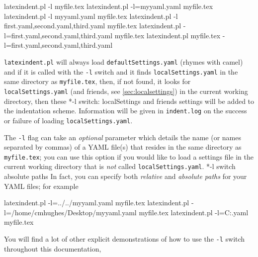 	\begin{commandshell}
latexindent.pl -l myfile.tex
latexindent.pl -l=myyaml.yaml myfile.tex
latexindent.pl -l myyaml.yaml myfile.tex
latexindent.pl -l first.yaml,second.yaml,third.yaml myfile.tex
latexindent.pl -l=first.yaml,second.yaml,third.yaml myfile.tex
latexindent.pl myfile.tex -l=first.yaml,second.yaml,third.yaml 
\end{commandshell}

	\label{page:localswitch}
	\texttt{latexindent.pl} will always load \texttt{defaultSettings.yaml} (rhymes with camel)
	and if it is called with the \texttt{-l} switch and it finds
	\texttt{localSettings.yaml} in the same directory as \texttt{myfile.tex}, then, if not
    found, it looks for \texttt{localSettings.yaml} (and friends, see \vref{sec:localsettings}) 
    in the current working directory, then these
	*{-l switch: localSettings and friends}
	settings will be added to the indentation scheme. Information will be given in
	\texttt{indent.log} on the success or failure of loading \texttt{localSettings.yaml}.

	The \texttt{-l} flag can take an \emph{optional} parameter which
	details the name (or names separated by commas) of a YAML file(s) that resides in the
	same directory as \texttt{myfile.tex}; you can use this option if you would like to
	load a settings file in the current working directory that is \emph{not}
	called \texttt{localSettings.yaml}.%
	*{-l switch absolute paths}
	In fact, you can specify both \emph{relative} and \emph{absolute paths} for
	your YAML files; for example
	\begin{commandshell}
latexindent.pl -l=../../myyaml.yaml myfile.tex
latexindent.pl -l=/home/cmhughes/Desktop/myyaml.yaml myfile.tex
latexindent.pl -l=C:\Users\cmhughes\Desktop\myyaml.yaml myfile.tex
\end{commandshell}
	You will find a lot of other explicit demonstrations of how to use the
	\texttt{-l} switch throughout this documentation,


